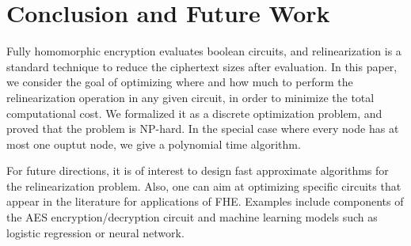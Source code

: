 \documentclass[11pt]{article} %
\theoremstyle{plain}
\newtheorem{fact}{Fact}
\theoremstyle{definition}
\begin{document}





\section{Conclusion and Future Work}

Fully homomorphic encryption evaluates boolean circuits, and relinearization is a standard technique to reduce the ciphertext sizes after evaluation. In this paper, we consider the goal of optimizing where and how much to perform the relinearization operation in any given circuit, in order to minimize the total computational cost. We formalized it as a discrete optimization problem, and proved that the problem is NP-hard. In the special case where every node has at most one ouptut node, we give a polynomial time algorithm. 

For future directions, it is of interest to design fast approximate algorithms for the relinearization problem. Also, one can aim at optimizing specific circuits that appear in the literature for applications of FHE. Examples include  components of the AES encryption/decryption circuit and machine learning models such as logistic regression or neural network. 

\nocite{*}


\end{document}
